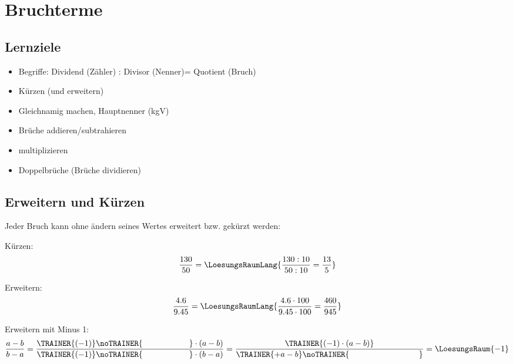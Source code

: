 \newpage
\section{Bruchterme}\label{bruchterme}

\subsection*{Lernziele}

\begin{itemize}
	\item Begriffe: Dividend (Zähler) : Divisor
	(Nenner)= Quotient (Bruch)
  \item Kürzen (und erweitern)
	\item Gleichnamig machen, Hauptnenner (kgV)
	\item Brüche addieren/subtrahieren
  \item multiplizieren
	\item Doppelbrüche (Brüche dividieren) 
\end{itemize}


\newpage

\subsection{Erweitern und Kürzen}

Jeder Bruch kann ohne ändern seines Wertes erweitert bzw. gekürzt
werden:

Kürzen:
$$\frac{130}{50} = \LoesungsRaumLang{\frac{130 : 10}{50:10} =\frac{13}{5}}$$

Erweitern:
$$\frac{4.6}{9.45} = \LoesungsRaumLang{\frac{4.6 \cdot{}100}{9.45\cdot{}100} =
\frac{460}{945}}$$

Erweitern mit Minus 1:
$$\frac{a-b}{b-a} = \frac{\TRAINER{(-1)}\noTRAINER{\hspace{20mm}}\cdot(a-b)}{\TRAINER{(-1)}\noTRAINER{\hspace{20mm}}\cdot(b-a)}
= \frac{\TRAINER{(-1)\cdot(a-b)}}{\TRAINER{+a-b}\noTRAINER{\hspace{30mm}}} = \LoesungsRaum{-1}$$

